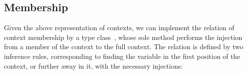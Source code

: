 \documentclass[9pt,authoryear]{sigplanconf}
\begin{document}
\subsection{Membership}

%
Given the above representation of contexts, we can implement
    the relation of context membership by a type class{~}\texttt{\makebox[1.22ex][c]{$ \in $}}, whose
    sole method performs the injection from a member of the context to
    the full context. The relation is defined by two inference rules,
    corresponding to finding the variable in the first position of the
    context, or further away in it, with the necessary injections{:}%


{\nopagebreak }

%
%
%
%
\end{document}
